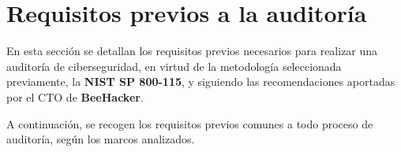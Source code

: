 \documentclass[a4paper, 11pt]{article}
\begin{document}
\clearpage

\thispagestyle{nohead}


















\section{Requisitos previos a la auditoría}
\par\vspace{0.5cm}
En esta sección se detallan los requisitos previos necesarios para realizar una auditoría de ciberseguridad, en virtud de la metodología seleccionada previamente, la \textbf{NIST SP 800-115}, y siguiendo las recomendaciones aportadas por el CTO de \textbf{BeeHacker}. 
\par\vspace{0.5cm}

A continuación, se recogen los requisitos previos comunes a todo proceso de auditoría, según los marcos analizados.

\par\vspace{0.5cm}
\end{document}
